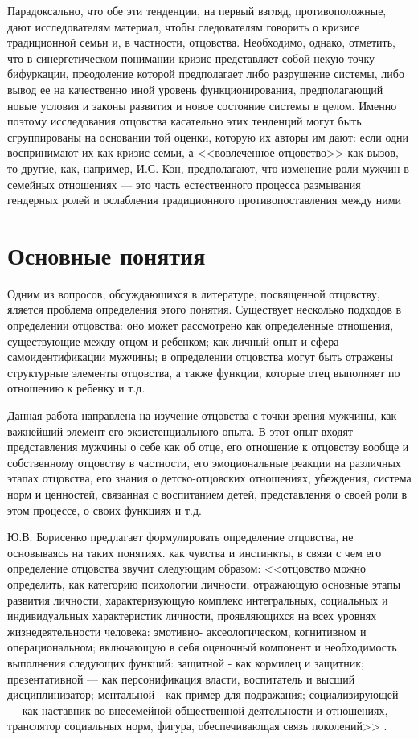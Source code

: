 \documentclass{../../common/thesisbyxetex}
\begin{document}
Парадоксально, что обе эти тенденции, на первый взгляд, противоположные, дают исследователям 
материал, чтобы следователям говорить о кризисе традиционной семьи и, в частности, 
отцовства.
Необходимо, однако, отметить, что в синергетическом понимании кризис представляет собой некую точку
бифуркации, преодоление которой предполагает либо разрушение системы, либо вывод ее на качественно
иной уровень функционирования, предполагающий новые условия и законы развития и новое состояние
системы в целом. Именно поэтому  исследования отцовства касательно этих тенденций могут быть 
сгруппированы на основании той оценки,
которую их авторы им дают: если одни воспринимают их как кризис семьи, а <<вовлеченное отцовство>>
как вызов, то другие, как, например, И.С. Кон, предполагают, что изменение роли мужчин в семейных
отношениях --- это часть естественного процесса размывания гендерных ролей и ослабления
традиционного противопоставления между ними \cite{konmen}

\section{Основные понятия}

Одним из вопросов, обсуждающихся в литературе, посвященной отцовству, яляется проблема определения
этого понятия. Существует несколько подходов в определении отцовства: оно может рассмотрено как
определенные отношения, существующие между отцом и ребенком; как личный опыт и сфера
самоидентификации мужчины; в определении отцовства могут быть отражены структурные элементы
отцовства, а также функции, которые отец выполняет по отношению к ребенку и т.д.

Данная работа направлена на изучение отцовства с точки зрения мужчины, как важнейший элемент его
экзистенциального опыта. В этот опыт входят представления мужчины о себе как об отце,
его отношение к отцовству вообще и собственному отцовству в частности, его
эмоциональные реакции на различных этапах отцовства, его знания о детско-отцовских
отношениях, убеждения, система норм и ценностей, связанная с воспитанием детей,
представления о своей роли в этом процессе, о своих функциях и т.д.

Ю.В. Борисенко предлагает формулировать определение отцовства, не основываясь на таких понятиях.
как чувства и инстинкты, в связи с чем его определение отцовства звучит следующим образом:
<<отцовство можно определить, как категорию психологии
личности, отражающую основные этапы развития личности, характеризующую
комплекс интегральных, социальных и индивидуальных характеристик личности,
проявляющихся на всех уровнях жизнедеятельности человека: эмотивно-
аксеологическом, когнитивном и операциональном; включающую в себя оценочный
компонент и необходимость выполнения следующих функций: защитной - как
кормилец и защитник; презентативной — как персонификация власти, воспитатель
и высший дисциплинизатор; ментальной - как пример для подражания;
социализирующей — как наставник во внесемейной общественной деятельности и
отношениях, транслятор социальных норм, фигура, обеспечивающая связь
поколений>> \cite[48]{psyot}.
\end{document}

